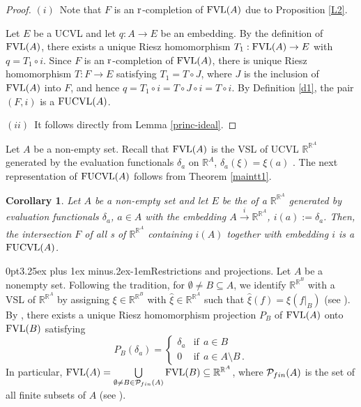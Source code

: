 \documentclass[12pt]{article}
\makeatletter
\newtheorem{cor}{Corollary}
\newcommand{\R}{\mathbb{R}}
\renewcommand{\subsection}{\@startsection{subsection}{1}
{0pt}{3.25ex plus 1ex minus.2ex}{-1em}{\normalfont\normalsize\bf}}
\makeatother
\begin{document}
\begin{proof}
$(i)$\
Note that $F$ is an $\text{\rm r}$-completion 
of $\text{\rm FVL}(A)$ due to Proposition \ref{L2}.

\smallskip
Let $E$ be a UCVL and let $q: A \to E$ be an embedding. 
By the definition of $\text{\rm FVL}(A)$, there exists 
a unique Riesz homomorphism $T_1:\text{\rm FVL}(A)\to E$
with $q = T_1\circ i$. Since $F$ is an $\text{\rm r}$-completion 
of $\text{\rm FVL}(A)$, there is 
unique Riesz homomorphism $T:F\to E$ satisfying $T_1 = T\circ J$,
where $J$ is the inclusion of $\text{\rm FVL}(A)$ into $F$, and hence
$q = T_1\circ i=T\circ J\circ i=T\circ i$.
By Definition \ref{d1}, the pair $(F,i)$ is a $\text{\rm FUCVL}(A)$.


\smallskip
$(ii)$\
It follows directly from Lemma \ref{princ-ideal}.
\end{proof}

Let $A$ be a non-empty set. Recall that $\text{\rm FVL}(A)$ is the VSL of 
UCVL $\R^{\R^A}$ generated by the evaluation functionals $\delta_a$ 
on $\R^A$, $\delta_a(\xi)=\xi(a)$ \cite[Theorem 2.4]{Baker}. The next 
representation of $\text{\rm FUCVL}(A)$ follows from Theorem \ref{maintt1}.

\begin{cor}\label{cortt1}
Let $A$ be a non-empty set and let $E$ be the  of a  
$\R^{\R^A}$ generated by evaluation functionals $\delta_a$, $a\in A$
with the embedding $A\xrightarrow[]{i}\R^{\R^A}$, $i(a):=\delta_a$. 
Then, the intersection $F$ of all \text{\rm UCVL}s of $\R^{\R^A}$ containing 
$i(A)$ together with embedding $i$ is a $\text{\rm FUCVL}(A)$.
\end{cor}


\subsection{Restrictions and projections.}
Let $A$ be a nonempty set. Following the tradition, for $\emptyset\ne B\subseteq A$, we identify 
$\R^{\R^B}$ with a VSL of  $\R^{\R^A}$
by assigning $\xi \in\R^{\R^B}$ with $\hat{\xi} \in\R^{\R^A}$ 
such that $\hat{\xi} (f) = \xi(f|_B)$ (see \cite{PW}).
By \cite[Proposition~3.5(2)]{PW}, there exists a unique Riesz 
homomorphism projection $P_B$ of $\text{\rm FVL}(A)$  onto $\text{\rm FVL}(B)$ satisfying
$$
   P_B(\delta_a)=
   \begin{cases}
   \delta_a  &  \text{if}  \ \  a\in B \\
   0  & \text{if}  \ \  a\in A\setminus B \, .
   \end{cases}
$$
In particular, 
$
   \text{\rm FVL}(A)= \bigcup\limits_{\emptyset\ne B\in{\cal P}_{fin}(A)}
   \text{\rm FVL}(B)\subseteq\R^{\R^A} 
$,
where ${\cal P}_{fin}(A)$ is the set of all finite subsets of $A$ (see \cite[Proposition 3.7]{PW}). 
\end{document}
